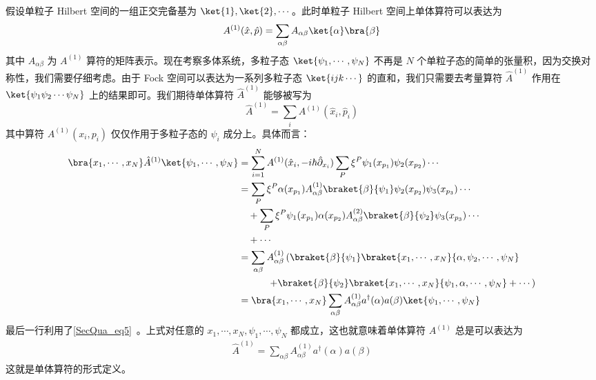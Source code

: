 假设单粒子 Hilbert 空间的一组正交完备基为 $\ket{1},\ket{2},\cdots$。此时单粒子 Hilbert 空间上单体算符可以表达为
\begin{equation}
A^{(1)}(\hat x,\hat p)=\sum_{\alpha\beta}A_{\alpha\beta} \ket{\alpha}\bra{\beta}
\end{equation}
其中 $A_{\alpha\beta}$ 为 $A^{(1)}$ 算符的矩阵表示。现在考察多体系统，多粒子态 $\ket{\psi_1,\cdots,\psi_N}$ 不再是 $N$ 个单粒子态的简单的张量积，因为交换对称性，我们需要仔细考虑。由于 Fock 空间可以表达为一系列多粒子态 $\ket{ijk\cdots}$ 的直和，我们只需要去考量算符 $\hat A^{(1)}$ 作用在 $\ket{\psi_1 \psi_2 \cdots\psi_N}$ 上的结果即可。我们期待单体算符 $\hat A^{(1)}$ 能够被写为
\begin{equation}
\hat A^{(1)}=\sum_{i} A^{(1)}(\hat x_i,\hat p_i)
\end{equation}
其中算符 $A^{(1)}(x_i,p_i)$ 仅仅作用于多粒子态的 $\psi_i$ 成分上。具体而言：
\begin{equation}
\begin{aligned}
\bra{x_1,\cdots,x_N}\hat A^{(1)} \ket{\psi_1,\cdots,\psi_N}&=\sum_{i=1}^N A^{(1)}(\hat x_i,-i\hbar\hat\partial_{x_i})\sum_{P} \xi^P \psi_1(x_{p_1})\psi_2(x_{p_2})\cdots\\
&=\sum_{P}\xi^P \alpha(x_{p_1})A_{\alpha\beta}^{(1)}\braket{\beta}{\psi_1}\psi_2(x_{p_2})\psi_3(x_{p_3})\cdots\\
&\quad +\sum_P\xi^P \psi_1(x_{p_1})\alpha(x_{p_2})A_{\alpha\beta}^{(2)}\braket{\beta}{\psi_2}\psi_3(x_{p_3})\cdots\\
&\quad +\cdots \\
&=\sum_{\alpha\beta} A_{\alpha\beta}^{(1)}\left(\braket{\beta}{\psi_1} \braket{x_1,\cdots,x_N}{\alpha,\psi_2,\cdots,\psi_N}\right.\\
&\left.\quad \quad\quad+\braket{\beta}{\psi_2}\braket{x_1,\cdots,x_N}{\psi_1,\alpha,\cdots,\psi_N}+\cdots\right)\\
&=\bra{x_1,\cdots,x_N}\sum_{\alpha\beta} A_{\alpha\beta}^{(1)}a^\dagger(\alpha)a(\beta)
\ket{\psi_1,\cdots,\psi_N}
\end{aligned}
\end{equation}
最后一行利用了\autoref{SecQua_eq5}~。上式对任意的 $x_1,\cdots,x_N,\psi_1,\cdots,\psi_N$ 都成立，这也就意味着单体算符 $A^{(1)}$ 总是可以表达为
\begin{equation}\label{oneopr_eq3}
\begin{aligned}
\hat A^{(1)}=\sum_{\alpha\beta}A_{\alpha\beta}^{(1)}a^\dagger(\alpha)a(\beta)
\end{aligned}
\end{equation}
这就是单体算符的形式定义。
